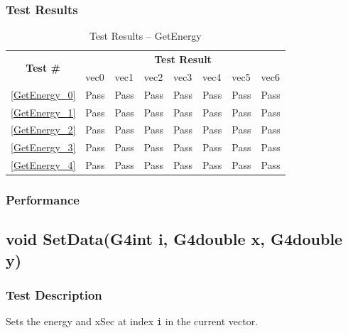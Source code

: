 \documentclass[12pt]{article}
\begin{document}
	\subsubsection{Test Results}
		\begin{table}[H]
		\centering
		\caption{Test Results -- GetEnergy}\label{GetEnergy_acc}
		\begin{tabular}{clllllll}
		\toprule
		\multirow{2}{*}{\bf Test \#} & \multicolumn{7}{c}{\bf Test Result}\\
		& vec0 & vec1 & vec2 & vec3 & vec4 & vec5 & vec6\\\midrule
		\ref{GetEnergy_0} & Pass & Pass & Pass & Pass & Pass & Pass & Pass\\
		\ref{GetEnergy_1} & Pass & Pass & Pass & Pass & Pass & Pass & Pass\\
		\ref{GetEnergy_2} & Pass & Pass & Pass & Pass & Pass & Pass & Pass\\
		\ref{GetEnergy_3} & Pass & Pass & Pass & Pass & Pass & Pass & Pass\\
		\ref{GetEnergy_4} & Pass & Pass & Pass & Pass & Pass & Pass & Pass\\
		\bottomrule
		\end{tabular}
		\end{table}

	\subsubsection{Performance}

\subsection{void SetData(G4int i, G4double x, G4double y)}
	\subsubsection{Test Description}
	Sets the energy and xSec at index \texttt{i} in the current vector. 
	
\end{document}
